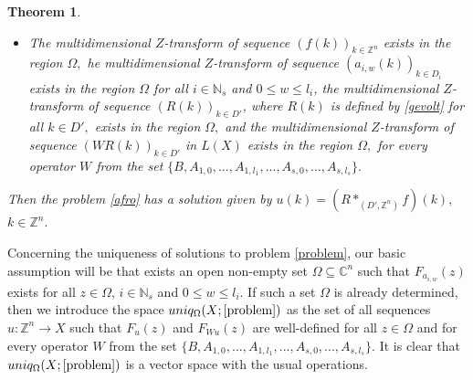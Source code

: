 \documentclass{amsart}
\newtheorem{thm}{Theorem}[section]
\theoremstyle{definition}
\theoremstyle{remark}
\numberwithin{equation}{section}
\begin{document}
\begin{thm}
\begin{itemize}
{\begin{align*}
\sum_{l\in {\mathbb Z}^{n}; k-l\in D_{i}}\Bigl| a_{i,s}(k-l)\Bigr| \sum_{m\in {\mathbb Z}^{n}; l-m\in D'}r_{1}^{l_{1}-m_{1}}\cdot ... \cdot r_{n}^{l_{n}-m_{n}}\sup_{|w_{1}|=r_{1};...;|w_{n}|=r_{n}} \\  &    p\Biggl( \Biggl[B +\sum_{j_{1}=0}^{l_{1}}w^{k_{1,j_{1}}}F_{a_{1,j_{1}}}(w)A_{1,j_{1}} 
+....+\sum_{j_{s}=0}^{l_{s}}w^{k_{s,j_{s}}}F_{a_{s,j_{s}}}(w)A_{s,j_{s}}\Biggr]^{-1}Cf(m)\Biggr) <+\infty,
\end{align*}}and{\scriptsize
\begin{align*} & 
\sum_{l\in {\mathbb Z}^{n}; k-l\in D_{i}}\Bigl| a_{i,s}(k-l)\Bigr| \sum_{m\in {\mathbb Z}^{n}; l-m\in D'}r_{1}^{l_{1}-m_{1}}\cdot ... \cdot r_{n}^{l_{n}-m_{n}}\sup_{|w_{1}|=r_{1};...;|w_{n}|=r_{n}} \\  &    p\Biggl(W\Biggl[B +\sum_{j_{1}=0}^{l_{1}}w^{k_{1,j_{1}}}F_{a_{1,j_{1}}}(w)A_{1,j_{1}} 
+....+\sum_{j_{s}=0}^{l_{s}}w^{k_{s,j_{s}}}F_{a_{s,j_{s}}}(w)A_{s,j_{s}}\Biggr]^{-1}Cf(m)\Biggr)<+\infty ,
\end{align*}}for every operator $W$ from the set $\{B,A_{1,0},...,A_{1,l_{1}},..., A_{s,0},...,A_{s,l_{s}}\}.$
\item[(iv)] The multidimensional $Z$-transform of sequence $(f(k))_{k\in {\mathbb Z}^{n}}$ exists in the region $\Omega ,$ he multidimensional $Z$-transform of sequence $(a_{i,w}(k))_{k\in D_{i}}$ exists in the region $\Omega $ for all $ i\in {\mathbb N}_{s}$ and $0\leq w\leq l_{i}$,
the multidimensional $Z$-transform of sequence $(R(k))_{k\in D'}$, where $R(k)$ is defined by \eqref{gevolt} for all $k\in D',$ exists in the region $\Omega ,$ and the multidimensional $Z$-transform of sequence $(WR(k))_{k\in D'}$ in $L(X)$ exists in the region $\Omega ,$ for every operator $W$ from the set $\{B,A_{1,0},...,A_{1,l_{1}},..., A_{s,0},...,A_{s,l_{s}}\}.$
\end{itemize} 
Then the problem \eqref{afro} has a solution given by $u(k)= (R\ast_{(D',{\mathbb Z}^{n})} f)(k),$ $k\in {\mathbb Z}^{n}.$ 
\end{thm}

Concerning the uniqueness of solutions to problem \eqref{problem}, our basic assumption will be that exists an open non-empty set $\Omega \subseteq {\mathbb C}^{n}$ such that $F_{a_{i,w}}(z)$ exists for all $z\in \Omega$, $ i\in {\mathbb N}_{s}$ and $0\leq w\leq l_{i}$. If such a set $\Omega$ is already determined, then we introduce the space
$
uniq_{\Omega}(X;\eqref{problem})$ as the set of all sequences $u : {\mathbb Z}^{n} \rightarrow X$ such that $F_{u}(z) $ and $F_{Wu}(z)$ are well-defined for all $z\in \Omega$ and for every operator $W$ from the set $\{B,A_{1,0},...,A_{1,l_{1}},..., A_{s,0},...,A_{s,l_{s}}\}.$
It is clear that $uniq_{\Omega}(X;\eqref{problem})$ is a vector space with the usual operations. 
\end{document}
